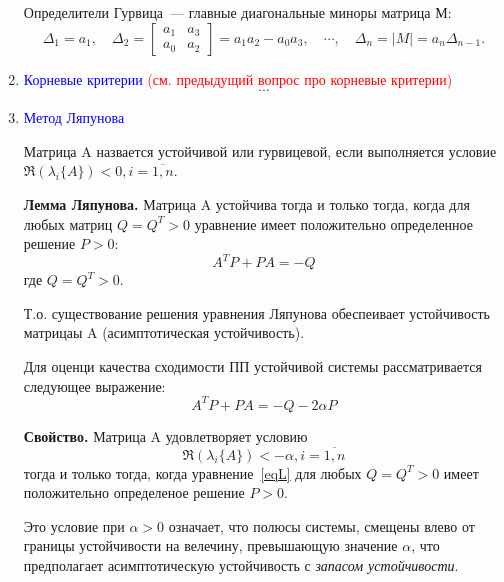 \begin{enumerate}
    Определители Гурвица~--- главные диагональные миноры матрица М:
    \begin{equation}
        \Delta_1 = a_1, \quad
        \Delta_2 = 
        \begin{bmatrix}
            a_1 & a_3 \\
            a_0 & a_2
        \end{bmatrix}
        = a_1 a_2 - a_0 a_3, \quad
        \cdots, \quad
        \Delta_n = |M| = a_n \Delta_{n-1}.
    \end{equation}
    
    \item \textcolor{blue}{Корневые критерии} \textcolor{red}{(см. предыдущий вопрос про корневые критерии)}
    \begin{equation}
        \cdots
    \end{equation}
    
    \item \textcolor{blue}{Метод Ляпунова}
    
    Матрица A назвается устойчивой или гурвицевой, если выполняется условие $\Re(\lambda_i\{A\}) < 0, i = \overline{1,n}$.
    
    \textbf{Лемма Ляпунова.} Матрица A устойчива тогда и только тогда, когда для любых матриц $Q = Q^T > 0$ уравнение имеет положительно определенное решение $P>0$:
    \begin{equation}
        A^T P + PA = - Q
    \end{equation}
    где $Q = Q^T >0$.
    
     Т.о. существование решения уравнения Ляпунова обеспеивает устойчивость матрицаы A (асимптотическая устойчивость).
     
     Для оценци качества сходимости ПП устойчивой системы рассматривается следующее выражение:
     \begin{equation}\label{eqL}
         A^T P + PA = -Q - 2 \alpha P
     \end{equation}
    
    \textbf{Свойство.} Матрица A удовлетворяет условию
    \begin{equation}
        \Re(\lambda_i\{A\}) < -\alpha, i = \overline{1,n}
    \end{equation}
    тогда и только тогда, когда уравнение~\eqref{eqL} для любых $Q=Q^T >0$ имеет положительно определеное решение $P>0$.
    
    Это условие при $\alpha > 0$ означает, что полюсы системы, смещены влево от границы устойчивости на велечину, превышающую значение $\alpha$, что предполагает асимптотическую устойчивость с \textit{запасом устойчивости}.
\end{enumerate}

